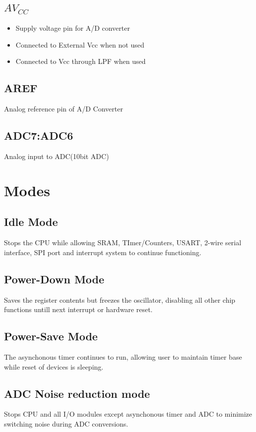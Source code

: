 \documentclass{article}
\begin{document}
\subsection{\texorpdfstring{$AV_{CC}$}{}}
\begin{itemize}
    \item Supply voltage pin for A/D converter
    \item Connected to External Vcc when not used
    \item Connected to Vcc through LPF when used
\end{itemize}

\subsection{AREF}
\quad Analog reference pin of A/D Converter

\subsection{ADC7:ADC6}
\quad Analog input to ADC(10bit ADC)


\section{Modes}
\subsection{Idle Mode}
\quad Stops the CPU while allowing SRAM, TImer/Counters, USART, 2-wire serial interface, SPI port and interrupt system to continue functioning.

\subsection{Power-Down Mode}
\quad Saves the register contents but freezes the oscillator, disabling all other chip functions untill next interrupt or hardware reset.

\subsection{Power-Save Mode}
\quad The asynchonous timer continues to run, allowing user to maintain timer base while reset of devices is sleeping.

\subsection{ADC Noise reduction mode}
\quad Stops CPU and all I/O modules except asynchonous timer and ADC to minimize switching noise during ADC conversions.
\end{document}
